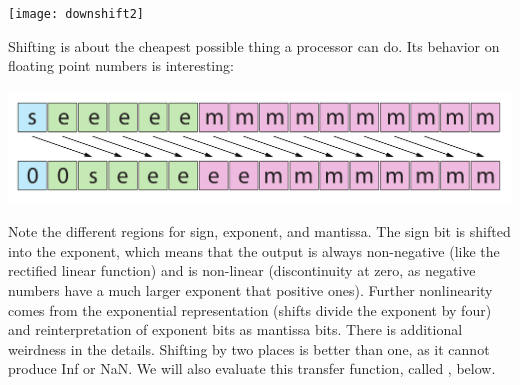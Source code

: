 \documentclass[twocolumn]{article}
\begin{document}
\begin{center}
\texttt{[image: downshift2]}
\end{center}


Shifting is about the cheapest possible thing a processor can do. Its
behavior on floating point numbers is interesting:

\includegraphics[width=0.9 \linewidth]{downshiftbits}

Note the different regions for sign, exponent, and mantissa.
The sign bit is shifted into the exponent, which means that the output
is always non-negative (like the rectified linear function) and is
non-linear (discontinuity at zero, as negative numbers have a much
larger exponent that positive ones). Further nonlinearity comes from
the exponential representation (shifts divide the exponent by four)
and reinterpretation of exponent bits as mantissa bits. There is
additional weirdness in the details. Shifting by two places is better
than one, as it cannot produce Inf or NaN.
We will also evaluate this transfer function, called \downshifttwo,
below.
\end{document}
